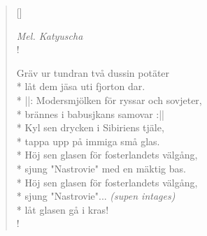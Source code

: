 
\settowidth{\versewidth}{Höj sen glasen för fosterlandets välgång,}



\begin{verse}[\versewidth]

\flagverse{}
\emph{Mel. Katyuscha}\\!

Gräv ur tundran två dussin potäter\\*
låt dem jäsa uti fjorton dar.\\*
||: Modersmjölken för ryssar och sovjeter,\\* 
brännes i babusjkans samovar :||\\*
Kyl sen drycken i Sibiriens tjäle,\\*
tappa upp på immiga små glas.\\*
Höj sen glasen för fosterlandets välgång,\\*
sjung "Nastrovie" med en mäktig bas.\\*
Höj sen glasen för fosterlandets välgång,\\* 
sjung "Nastrovie"... \emph{(supen intages)}\\*
låt glasen gå i kras!\\!




\end{verse}

